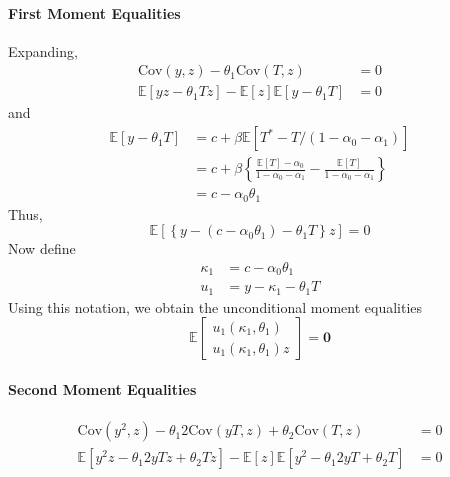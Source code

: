 \documentclass[12pt]{article}
\begin{document}
\paragraph{First Moment Equalities}
Expanding,
\begin{align*}
  \mbox{Cov}(y,z) - \theta_1 \mbox{Cov}(T,z) &= 0\\
  \mathbb{E}[yz - \theta_1 Tz] - \mathbb{E}[z]\mathbb{E}[y - \theta_1 T]&= 0
\end{align*}
and
\begin{align*}
  \mathbb{E}[y - \theta_1 T] &= c + \beta \mathbb{E}\left[ T^* - T/(1 - \alpha_0 - \alpha_1) \right]\\
  &= c + \beta\left\{ \frac{\mathbb{E}[T] - \alpha_0}{1 - \alpha_0 - \alpha_1} - \frac{\mathbb{E}[T]}{1 - \alpha_0 - \alpha_1} \right\}\\
&= c - \alpha_0 \theta_1 
\end{align*}
Thus,
\[
  \mathbb{E}\left[ \left\{ y - \left( c - \alpha_0 \theta_1 \right) - \theta_1 T\right\}z \right] = 0
\]
Now define 
\begin{align*}
\kappa_1 &= c - \alpha_0 \theta_1\\
u_1 &= y - \kappa_1 - \theta_1 T
\end{align*}
Using this notation, we obtain the unconditional moment equalities
\[
  \mathbb{E}\left[
  \begin{array}{l}
    u_1(\kappa_1, \theta_1)\\ u_1(\kappa_1, \theta_1) z
  \end{array}
\right] = \mathbf{0}
\]

\paragraph{Second Moment Equalities}

\begin{align*}
  \mbox{Cov}(y^2,z) - \theta_1 2\mbox{Cov}(yT,z) + \theta_2 \mbox{Cov}(T,z)&= 0\\
  \mathbb{E}\left[ y^2z - \theta_1 2yTz + \theta_2 Tz \right] -\mathbb{E}\left[ z \right]\mathbb{E}\left[ y^2 - \theta_1 2yT + \theta_2 T \right] &= 0
\end{align*}
\end{document}
